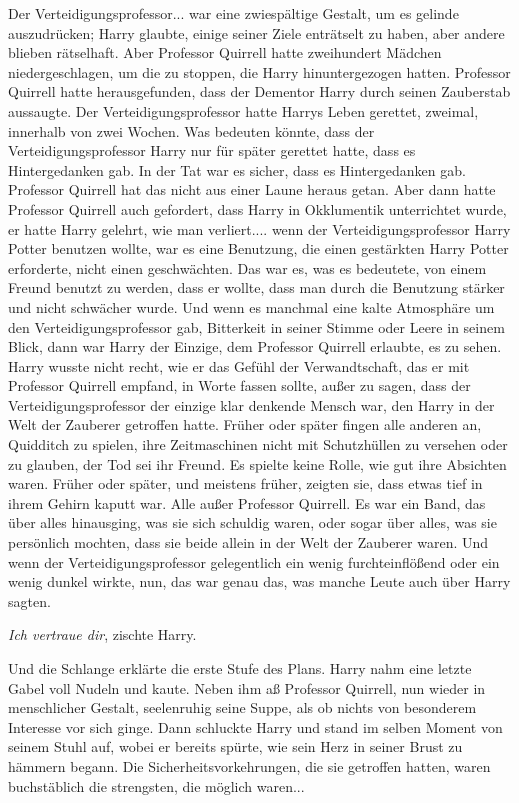 Der Verteidigungsprofessor... war eine zwiespältige Gestalt, um es gelinde
auszudrücken; Harry glaubte, einige seiner Ziele enträtselt zu haben, aber
andere blieben rätselhaft. Aber Professor Quirrell hatte zweihundert Mädchen
niedergeschlagen, um die zu stoppen, die Harry hinuntergezogen hatten. Professor
Quirrell hatte herausgefunden, dass der Dementor Harry durch seinen Zauberstab
aussaugte. Der Verteidigungsprofessor hatte Harrys Leben gerettet, zweimal,
innerhalb von zwei Wochen. Was bedeuten könnte, dass der Verteidigungsprofessor
Harry nur für später gerettet hatte, dass es Hintergedanken gab. In der Tat war
es sicher, dass es Hintergedanken gab. Professor Quirrell hat das nicht aus
einer Laune heraus getan. Aber dann hatte Professor Quirrell auch gefordert,
dass Harry in Okklumentik unterrichtet wurde, er hatte Harry gelehrt, wie man
verliert.... wenn der Verteidigungsprofessor Harry Potter benutzen wollte, war
es eine Benutzung, die einen gestärkten Harry Potter erforderte, nicht einen
geschwächten. Das war es, was es bedeutete, von einem Freund benutzt zu werden,
dass er wollte, dass man durch die Benutzung stärker und nicht schwächer wurde.
Und wenn es manchmal eine kalte Atmosphäre um den Verteidigungsprofessor gab,
Bitterkeit in seiner Stimme oder Leere in seinem Blick, dann war Harry der
Einzige, dem Professor Quirrell erlaubte, es zu sehen. Harry wusste nicht recht,
wie er das Gefühl der Verwandtschaft, das er mit Professor Quirrell empfand, in
Worte fassen sollte, außer zu sagen, dass der Verteidigungsprofessor der einzige
klar denkende Mensch war, den Harry in der Welt der Zauberer getroffen hatte.
Früher oder später fingen alle anderen an, Quidditch zu spielen, ihre
Zeitmaschinen nicht mit Schutzhüllen zu versehen oder zu glauben, der Tod sei
ihr Freund. Es spielte keine Rolle, wie gut ihre Absichten waren. Früher oder
später, und meistens früher, zeigten sie, dass etwas tief in ihrem Gehirn kaputt
war. Alle außer Professor Quirrell. Es war ein Band, das über alles hinausging,
was sie sich schuldig waren, oder sogar über alles, was sie persönlich mochten,
dass sie beide allein in der Welt der Zauberer waren. Und wenn der
Verteidigungsprofessor gelegentlich ein wenig furchteinflößend oder ein wenig
dunkel wirkte, nun, das war genau das, was manche Leute auch über Harry sagten.

\glqq \emph{Ich vertraue dir}\grqq{}, zischte Harry.

Und die Schlange erklärte die erste Stufe des Plans. Harry nahm eine letzte
Gabel voll Nudeln und kaute. Neben ihm aß Professor Quirrell, nun wieder in
menschlicher Gestalt, seelenruhig seine Suppe, als ob nichts von besonderem
Interesse vor sich ginge. Dann schluckte Harry und stand im selben Moment von
seinem Stuhl auf, wobei er bereits spürte, wie sein Herz in seiner Brust zu
hämmern begann. Die Sicherheitsvorkehrungen, die sie getroffen hatten, waren
buchstäblich die strengsten, die möglich waren...

